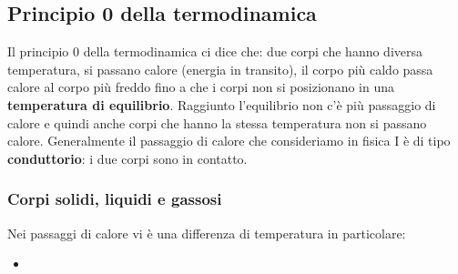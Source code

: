 \documentclass{article}
\numberwithin{equation}{subsection}
\begin{document}
\subsection{Principio 0 della termodinamica}
Il principio 0 della termodinamica ci dice che: due corpi che hanno diversa temperatura, si passano calore (energia in transito), il corpo più caldo passa calore al corpo più freddo fino a che i corpi non si posizionano in una \textbf{temperatura di equilibrio}. Raggiunto l'equilibrio non c'è più passaggio di calore e quindi anche corpi che hanno la stessa temperatura non si passano calore. Generalmente il passaggio di calore che consideriamo in fisica I è di tipo \textbf{conduttorio}: i due corpi sono in contatto.
\subsubsection{Corpi solidi, liquidi e gassosi}
Nei passaggi di calore vi è una differenza di temperatura in particolare:
\begin{itemize}
    \item 
\end{itemize}
\clearpage
\end{document}

